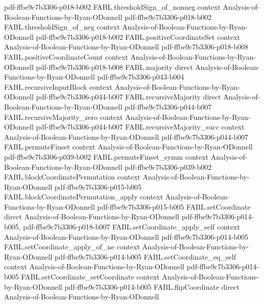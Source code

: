 \begin{theorem}
  {pdf-ffbe9c7b3306-p018-b002}
\proofstep
  {FABL.thresholdSign_of_nonneg}
  {context}
  {Analysis-of-Boolean-Functions-by-Ryan-ODonnell}
  {pdf-ffbe9c7b3306-p018-b002}
\proofstep
  {FABL.thresholdSign_of_neg}
  {context}
  {Analysis-of-Boolean-Functions-by-Ryan-ODonnell}
  {pdf-ffbe9c7b3306-p018-b002}
\proofstep
  {FABL.positiveCoordinateSet}
  {context}
  {Analysis-of-Boolean-Functions-by-Ryan-ODonnell}
  {pdf-ffbe9c7b3306-p018-b008}
\proofstep
  {FABL.positiveCoordinateCount}
  {context}
  {Analysis-of-Boolean-Functions-by-Ryan-ODonnell}
  {pdf-ffbe9c7b3306-p018-b008}
\proofstep
  {FABL.majority}
  {direct}
  {Analysis-of-Boolean-Functions-by-Ryan-ODonnell}
  {pdf-ffbe9c7b3306-p043-b004}
\proofstep
  {FABL.recursiveInputBlock}
  {context}
  {Analysis-of-Boolean-Functions-by-Ryan-ODonnell}
  {pdf-ffbe9c7b3306-p044-b007}
\proofstep
  {FABL.recursiveMajority}
  {direct}
  {Analysis-of-Boolean-Functions-by-Ryan-ODonnell}
  {pdf-ffbe9c7b3306-p044-b007}
\proofstep
  {FABL.recursiveMajority_zero}
  {context}
  {Analysis-of-Boolean-Functions-by-Ryan-ODonnell}
  {pdf-ffbe9c7b3306-p044-b007}
\proofstep
  {FABL.recursiveMajority_succ}
  {context}
  {Analysis-of-Boolean-Functions-by-Ryan-ODonnell}
  {pdf-ffbe9c7b3306-p044-b007}
\proofstep
  {FABL.permuteFinset}
  {context}
  {Analysis-of-Boolean-Functions-by-Ryan-ODonnell}
  {pdf-ffbe9c7b3306-p039-b002}
\proofstep
  {FABL.permuteFinset_symm}
  {context}
  {Analysis-of-Boolean-Functions-by-Ryan-ODonnell}
  {pdf-ffbe9c7b3306-p039-b002}
\proofstep
  {FABL.blockCoordinatePermutation}
  {context}
  {Analysis-of-Boolean-Functions-by-Ryan-ODonnell}
  {pdf-ffbe9c7b3306-p015-b005}
\proofstep
  {FABL.blockCoordinatePermutation_apply}
  {context}
  {Analysis-of-Boolean-Functions-by-Ryan-ODonnell}
  {pdf-ffbe9c7b3306-p015-b005}
\proofstep
  {FABL.setCoordinate}
  {direct}
  {Analysis-of-Boolean-Functions-by-Ryan-ODonnell}
  {pdf-ffbe9c7b3306-p014-b005,
    pdf-ffbe9c7b3306-p018-b007}
\proofstep
  {FABL.setCoordinate_apply_self}
  {context}
  {Analysis-of-Boolean-Functions-by-Ryan-ODonnell}
  {pdf-ffbe9c7b3306-p014-b005}
\proofstep
  {FABL.setCoordinate_apply_of_ne}
  {context}
  {Analysis-of-Boolean-Functions-by-Ryan-ODonnell}
  {pdf-ffbe9c7b3306-p014-b005}
\proofstep
  {FABL.setCoordinate_eq_self}
  {context}
  {Analysis-of-Boolean-Functions-by-Ryan-ODonnell}
  {pdf-ffbe9c7b3306-p014-b005}
\proofstep
  {FABL.setCoordinate_setCoordinate}
  {context}
  {Analysis-of-Boolean-Functions-by-Ryan-ODonnell}
  {pdf-ffbe9c7b3306-p014-b005}
\proofstep
  {FABL.flipCoordinate}
  {direct}
  {Analysis-of-Boolean-Functions-by-Ryan-ODonnell}

\end{theorem}
